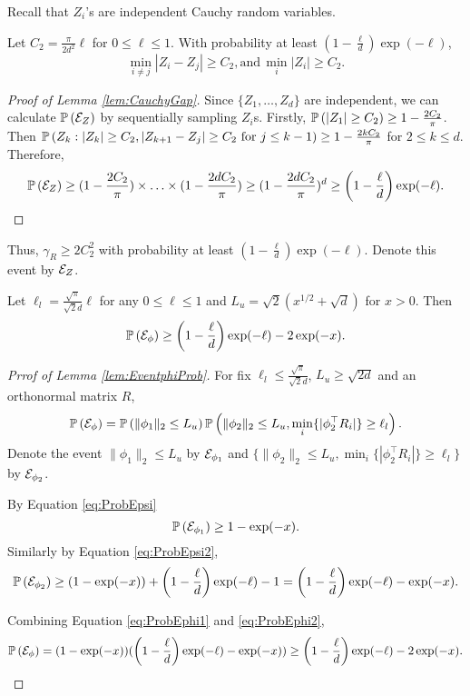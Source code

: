 Recall that $Z_i$'s are independent Cauchy random variables.
\begin{lemma}
\label{lem:CauchyGap}
Let $C_2 = \frac{\pi}{2d^2}\ell$ for $0\le \ell\le 1$. 
With probability at least $\left(1- \frac{\ell}{d}\right)\exp(-\ell)$,
\[
\min_{i\neq j} \left\vert Z_i - Z_j \right\vert \ge C_2, \text{and} \,  \min_i\vert Z_i\vert \ge C_2.
\]
\end{lemma}
\begin{proof}[Proof of Lemma \ref{lem:CauchyGap}]
Since $\{Z_1,\ldots, Z_d\}$ are independent, we can calculate $\mathbb{P}\left(\mathcal{E}_{Z}\right)$ by sequentially sampling $Z_i$s. 
Firstly, $\mathbb{P}\left(|Z_1|\ge C_2\right) \ge 1-\frac{2C_2}{\pi}$. 
Then $\mathbb{P}\left(Z_{k}: |Z_{k}|\ge C_2, |Z_{k+1}- Z_j|\ge C_2 \text{ for } j\le k-1\right) \ge 1-\frac{2kC_2}{\pi}$ for $2 \le k\le d$.
Therefore,
\begin{equation}
\label{eq:ProbEZ}
\mathbb{P}\left(\mathcal{E}_{Z}\right) \ge (1-\frac{2C_2}{\pi})\times \ldots \times (1-\frac{2dC_2}{\pi}) \ge (1-\frac{2dC_2}{\pi})^d \ge \left(1- \frac{\ell}{d}\right)\exp(-\ell).
\end{equation}
\end{proof}
Thus, $\gamma_R \ge 2C_2^2$ with probability at least $\left(1- \frac{\ell}{d}\right)\exp(-\ell)$.
Denote this event by $\mathcal{E}_{Z}$.
\begin{lemma}
\label{lem:EventphiProb}
Let $\ell_l = \frac{\sqrt{\pi}}{\sqrt{2}d}\ell$ for any $0\le \ell\le 1$ and $ L_u = \sqrt{2}\left(x^{1/2}+\sqrt{d}\right)$ for $x>0$. Then
\[
\mathbb{P}\left(\mathcal{E}_{\phi}\right) \ge \left(1- \frac{\ell}{d}\right)\exp(-\ell) - 2\exp(-x).
\]
\end{lemma}
\begin{proof}[Prrof of Lemma \ref{lem:EventphiProb}]
For fix $\ell_l\le \frac{\sqrt{\pi}}{\sqrt{2}d}$, $L_u \ge \sqrt{2d}$ and an orthonormal matrix $R$, 
\[
\mathbb{P}\left(\mathcal{E}_{\phi}\right) = \mathbb{P}\left(\|\phi_1\|_2\le L_u\right)\mathbb{P}\left(\|\phi_2\|_2\le L_u, \min_i \{|\phi_2^{\top}R_i|\} \ge \ell_l\right).
\]
Denote the event $\|\phi_1\|_2\le L_u$ by $\mathcal{E}_{\phi_1}$ and $\{\|\phi_2\|_2\le L_u, \min_i \{|\phi_2^{\top}R_i|\} \ge \ell_l\}$ by $\mathcal{E}_{\phi_2}$. 

By Equation \eqref{eq:ProbEpsi}
\begin{equation}
\label{eq:ProbEphi1}
\mathbb{P}\left(\mathcal{E}_{\phi_1}\right) \ge 1-\exp(-x).
\end{equation}
Similarly by Equation \eqref{eq:ProbEpsi2},
\begin{equation}
\label{eq:ProbEphi2}
\mathbb{P}\left(\mathcal{E}_{\phi_2}\right) \ge (1-\exp(-x))+\left(1- \frac{\ell}{d}\right)\exp(-\ell)-1 = \left(1- \frac{\ell}{d}\right)\exp(-\ell)-\exp(-x).
\end{equation}

Combining Equation \eqref{eq:ProbEphi1} and \eqref{eq:ProbEphi2},
\[
\mathbb{P}\left(\mathcal{E}_{\phi}\right) = (1-\exp(-x))(\left(1- \frac{\ell}{d}\right)\exp(-\ell)-\exp(-x)) \ge \left(1- \frac{\ell}{d}\right)\exp(-\ell) - 2\exp(-x).
\]
\end{proof}

